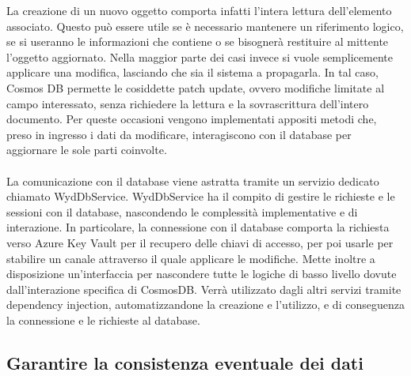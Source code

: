 La creazione di un nuovo oggetto comporta infatti l'intera lettura dell'elemento associato.
Questo può essere utile se è necessario mantenere un riferimento logico,
se si useranno le informazioni che contiene
o se bisognerà restituire al mittente l'oggetto aggiornato.
Nella maggior parte dei casi invece si vuole semplicemente applicare una modifica,
lasciando che sia il sistema a propagarla.
In tal caso, Cosmos DB permette le cosiddette patch update,
ovvero modifiche limitate al campo interessato,
senza richiedere la lettura e la sovrascrittura dell'intero documento.
Per queste occasioni vengono implementati appositi metodi che,
preso in ingresso i dati da modificare,
interagiscono con il database per aggiornare le sole parti coinvolte.\\
\\
La comunicazione con il database viene astratta tramite un servizio dedicato chiamato WydDbService.
WydDbService ha il compito di gestire le richieste e le sessioni con il database,
nascondendo le complessità implementative e di interazione.
In particolare, la connessione con il database comporta
la richiesta verso Azure Key Vault per il recupero delle chiavi di accesso,
per poi usarle per stabilire un canale attraverso il quale applicare le modifiche.
Mette inoltre a disposizione un'interfaccia per nascondere
tutte le logiche di basso livello dovute dall'interazione specifica di CosmosDB.
Verrà utilizzato dagli altri servizi tramite dependency injection,
automatizzandone la creazione e l'utilizzo, e di conseguenza la connessione e le richieste al database. \\

\subsection{Garantire la consistenza eventuale dei dati}

